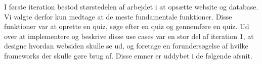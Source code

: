 I første iteration bestod størstedelen af arbejdet i at opsætte website og database. Vi valgte derfor kun medtage at de meste fundamentale funktioner. Disse funktioner var at oprette en quiz, søge efter en quiz og gennemføre en quiz. Ud over at implementere og beskrive disse use cases var en stor del af iteration 1, at designe hvordan websiden skulle se ud, og foretage en forundersøgelse af hvilke frameworks der skulle gøre brug af. Disse emner er uddybet i de følgende afsnit.















